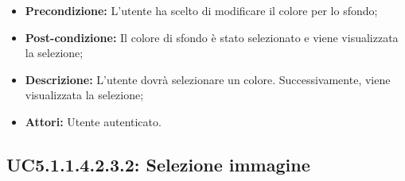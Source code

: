 \begin{itemize}
	\item \textbf{Precondizione:} L'utente ha scelto di modificare il colore per lo sfondo;
	\item \textbf{Post-condizione:} Il colore di sfondo è stato selezionato e viene visualizzata la selezione;
	\item \textbf{Descrizione:} L'utente dovrà selezionare un colore.  Successivamente, viene visualizzata la selezione;
	\item \textbf{Attori:} Utente autenticato.
\end{itemize}
\subsection{ UC5.1.1.4.2.3.2: Selezione immagine}

